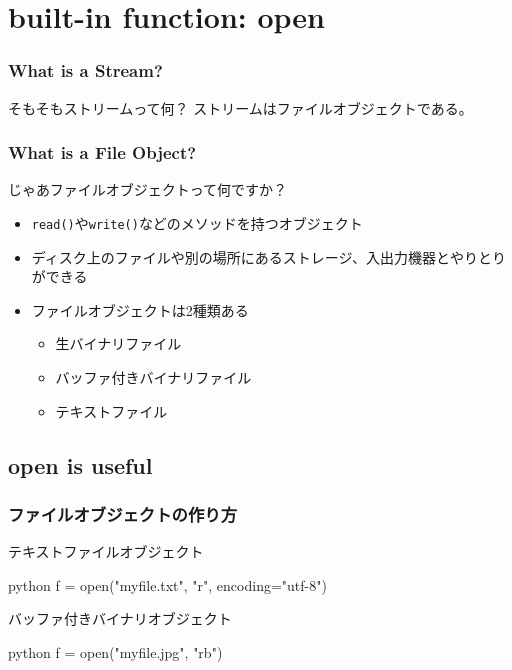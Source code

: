 \documentclass[dvipdfmx,12pt,notheorems]{beamer}
\theoremstyle{definition}
\begin{document}
\section{built-in function: open}

\begin{frame}\frametitle{What is a Stream?}

\begin{block}{そもそもストリームって何？}
ストリームはファイルオブジェクトである。
\end{block}

\end{frame}

\begin{frame}\frametitle{What is a File Object?}

\begin{block}{じゃあファイルオブジェクトって何ですか？}
\begin{itemize}
\item \texttt{read()}や\texttt{write()}などのメソッドを持つオブジェクト
\item ディスク上のファイルや別の場所にあるストレージ、入出力機器とやりとりができる
\item ファイルオブジェクトは2種類ある
	\begin{itemize}
	\item 生バイナリファイル
	\item バッファ付きバイナリファイル
	\item テキストファイル
	\end{itemize}
\end{itemize}
\end{block}

\end{frame}

\subsection{open is useful}

\begin{frame}[fragile]\frametitle{ファイルオブジェクトの作り方}

\begin{exampleblock}{テキストファイルオブジェクト}
\begin{pygments}{python}
f = open("myfile.txt", "r", encoding="utf-8")
\end{pygments}
\end{exampleblock}

\begin{exampleblock}{バッファ付きバイナリオブジェクト}
\begin{pygments}{python}
f = open("myfile.jpg", "rb")
\end{pygments}
\end{exampleblock}

\end{frame}
\end{document}
